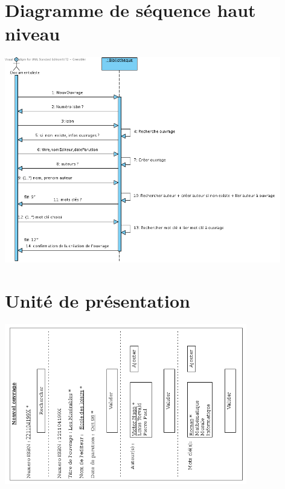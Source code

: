 \documentclass[a4paper,10pt]{report}
\begin{document}
\bigskip

\section*{Diagramme de séquence haut niveau}
\includegraphics[height=90mm]{NouvOuvrageHautNiveau.png}

\newpage

\section*{Unité de présentation}
\includegraphics[height=70mm]{UpNouvOuvrage.png}
\end{document}
